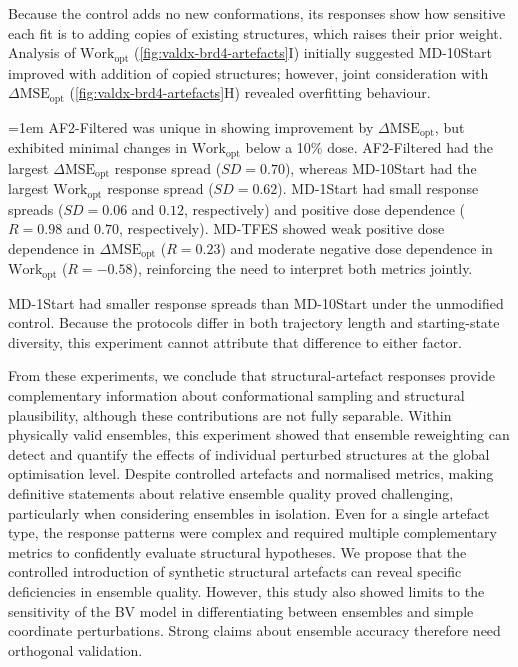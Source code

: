 Because the control adds no new conformations, its responses show how sensitive each fit is to adding copies of existing structures, which raises their prior weight. Analysis of $\text{Work}_{\text{opt}}$ (\cref{fig:valdx-brd4-artefacts}I) initially suggested MD-10Start improved with addition of copied structures; however, joint consideration with $\Delta \text{MSE}_{\text{opt}}$ (\cref{fig:valdx-brd4-artefacts}H) revealed overfitting behaviour.

{\emergencystretch=1em AF2-Filtered was unique in showing improvement by $\Delta \text{MSE}_{\text{opt}}$, but exhibited minimal changes in $\text{Work}_{\text{opt}}$ below a 10\% dose. AF2-Filtered had the largest $\Delta \text{MSE}_{\text{opt}}$ response spread ($SD=0.70$), whereas MD-10Start had the largest $\text{Work}_{\text{opt}}$ response spread ($SD=0.62$). MD-1Start had small response spreads ($SD=0.06$ and $0.12$, respectively) and positive dose dependence ($R=0.98$ and $0.70$, respectively). MD-TFES showed weak positive dose dependence in $\Delta \text{MSE}_{\text{opt}}$ ($R=0.23$) and moderate negative dose dependence in $\text{Work}_{\text{opt}}$ ($R=-0.58$), reinforcing the need to interpret both metrics jointly.\par}

MD-1Start had smaller response spreads than MD-10Start under the unmodified control. Because the protocols differ in both trajectory length and starting-state diversity, this experiment cannot attribute that difference to either factor.

From these experiments, we conclude that structural-artefact responses provide complementary information about conformational sampling and structural plausibility, although these contributions are not fully separable. Within physically valid ensembles, this experiment showed that ensemble reweighting can detect and quantify the effects of individual perturbed structures at the global optimisation level. Despite controlled artefacts and normalised metrics, making definitive statements about relative ensemble quality proved challenging, particularly when considering ensembles in isolation. Even for a single artefact type, the response patterns were complex and required multiple complementary metrics to confidently evaluate structural hypotheses. We propose that the controlled introduction of synthetic structural artefacts can reveal specific deficiencies in ensemble quality. However, this study also showed limits to the sensitivity of the BV model in differentiating between ensembles and simple coordinate perturbations. Strong claims about ensemble accuracy therefore need orthogonal validation.

